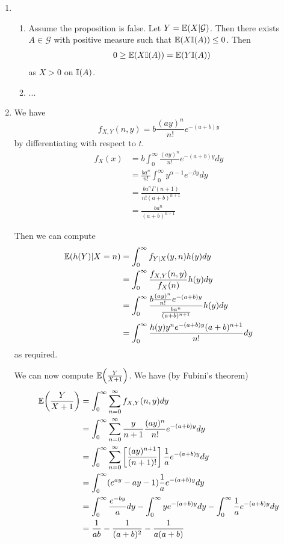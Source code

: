 \begin{enumerate}
\item
  \begin{enumerate}
  \item Assume the proposition is false. Let $Y = \E{X |
      \mathcal{G}}$. Then there exists $A \in \mathcal{G}$ with
    positive measure such that $\E{X \I{A}} \leq 0$. Then
    \begin{align}
      \label{eq:8}
      0 \geq \E{X \I{A}} &= \E{Y \I{A}}
    \end{align} as $X > 0$ on $\I{A}$.
  \item ...
  \end{enumerate}


\item We have
  \begin{equation}
    \label{eq:12}
    f_{X, Y}(n, y) = b \frac{(ay)^{n}}{n!} e^{-(a+b)y}
  \end{equation} by differentiating with respect to $t$.
  \begin{align}
    \label{eq:10}
    f_{X}(x) &= b \int_{0}^{\infty} \frac{(ay)^{n}}{n!} e^{-(a+b)y} dy
    \\
    &= \frac{ba^{n}}{n!} \int_{0}^{\infty} y^{\alpha - 1} e^{-\beta y}
    dy \\
    &= \frac{ba^{n} \Gamma(n+1)}{n! (a+b)^{n+1}} \\
    &= \frac{ba^{n}}{(a+b)^{n+1}}
  \end{align}

  Then we can compute
  \begin{align}
    \label{eq:11}
    \E{h(Y) | X = n} &= \int_{0}^{\infty} f_{Y|X}(y, n) h(y) dy \\
    &= \int_{0}^{\infty} \frac{f_{X, Y}(n, y)}{f_{X}(n)} h(y) dy \\
    &= \int_{0}^{\infty} \frac{b \frac{(ay)^{n}}{n!} e^{-(a+b)
        y}}{\frac{ba^{n}}{(a+b)^{n+1}}} h(y) dy \\
    &= \int_{0}^{\infty} \frac{h(y) y^{n} e^{-(a+b)y}(a+b)^{n+1}}{n!}
    dy
  \end{align}
  as required.

  We can now compute $\E{\frac{Y}{X+1}}$. We have (by Fubini's
  theorem)
  \begin{align}
    \label{eq:16}
    \E{\frac{Y}{X+1}} &= \int_{0}^{\infty} \sum_{n=0}^{\infty} f_{X,
      Y}(n, y) dy \\
    &= \int_{0}^{\infty} \sum_{n=0}^{\infty} \frac{y}{n+1}
    \frac{(ay)^{n}}{n!} e^{-(a+b)y} dy \\
    &= \int_{0}^{\infty} \sum_{n=0}^{\infty} \left[
      \frac{(ay)^{n+1}}{(n+1)!} \right] \frac{1}{a} e^{-(a+b)y} dy \\
    &= \int_{0}^{\infty} (e^{ay}- ay - 1) \frac{1}{a} e^{-(a+b)y} dy
    \\
    &= \int_{0}^{\infty} \frac{e^{-by}}{a} dy - \int_{0}^{\infty}
    ye^{-(a+b)y} dy - \int_{0}^{\infty} \frac{1}{a} e^{-(a+b)y} dy \\
    &= \frac{1}{ab} - \frac{1}{(a+b)^{2}} - \frac{1}{a(a+b)}
  \end{align}
  

\end{enumerate}
